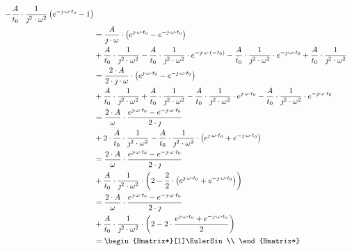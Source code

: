 \begin{task}
\begin{align*}
-\frac{A}{t_{0}}\cdot \frac{1}{\jmath^{2} \cdot \omega^{2}} \left(e^{ -\jmath \cdot \omega \cdot t_{0}}-1\right)\\
&= \frac{A}{\jmath \cdot \omega}\cdot \left( e^{ \jmath \cdot \omega \cdot t_{0}} - e^{ -\jmath \cdot \omega \cdot t_{0}} \right)\\
&+ \frac{A}{t_{0}}\cdot \frac{1}{\jmath^{2} \cdot \omega^{2}}  - \frac{A}{t_{0}}\cdot \frac{1}{\jmath^{2} \cdot \omega^{2}} \cdot e^{ -\jmath \cdot \omega \cdot (-t_{0})} -\frac{A}{t_{0}}\cdot \frac{1}{\jmath^{2} \cdot \omega^{2}} \cdot e^{ -\jmath \cdot \omega \cdot t_{0}} + \frac{A}{t_{0}}\cdot \frac{1}{\jmath^{2} \cdot \omega^{2}}\\
&= \frac{2\cdot A}{2\cdot \jmath \cdot \omega}\cdot \left( e^{ \jmath \cdot \omega \cdot t_{0}} - e^{ -\jmath \cdot \omega \cdot t_{0}} \right)\\
&+ \frac{A}{t_{0}}\cdot \frac{1}{\jmath^{2} \cdot \omega^{2}}  + \frac{A}{t_{0}}\cdot \frac{1}{\jmath^{2} \cdot \omega^{2}}  - \frac{A}{t_{0}}\cdot \frac{1}{\jmath^{2} \cdot \omega^{2}} \cdot e^{\jmath \cdot \omega \cdot t_{0}} -\frac{A}{t_{0}}\cdot \frac{1}{\jmath^{2} \cdot \omega^{2}} \cdot e^{ -\jmath \cdot \omega \cdot t_{0}}\\
&= \frac{2\cdot A}{\omega}\cdot \frac{e^{ \jmath \cdot \omega \cdot t_{0}} - e^{ -\jmath \cdot \omega \cdot t_{0}}}{2\cdot \jmath}\\
&+ 2\cdot \frac{A}{t_{0}}\cdot \frac{1}{\jmath^{2} \cdot \omega^{2}}  - \frac{A}{t_{0}}\cdot \frac{1}{\jmath^{2} \cdot \omega^{2}} \cdot \left(e^{ \jmath \cdot \omega \cdot t_{0}} +e^{ -\jmath \cdot \omega \cdot t_{0}}\right)\\
&= \frac{2\cdot A}{\omega}\cdot \frac{e^{ \jmath \cdot \omega \cdot t_{0}} - e^{ -\jmath \cdot \omega \cdot t_{0}}}{2\cdot \jmath}\\
&+ \frac{A}{t_{0}}\cdot \frac{1}{\jmath^{2} \cdot \omega^{2}} \cdot \left(2  - \frac{2}{2}\cdot \left(e^{ \jmath \cdot \omega \cdot t_{0}} +e^{ -\jmath \cdot \omega \cdot t_{0}}\right)\right)\\
&= \frac{2\cdot A}{\omega}\cdot \frac{e^{ \jmath \cdot \omega \cdot t_{0}} - e^{ -\jmath \cdot \omega \cdot t_{0}}}{2\cdot \jmath}\\
&+ \frac{A}{t_{0}}\cdot \frac{1}{\jmath^{2} \cdot \omega^{2}} \cdot \left(2  - 2\cdot \frac{e^{ \jmath \cdot \omega \cdot t_{0}} +e^{ -\jmath \cdot \omega \cdot t_{0}}}{2}\right)\\
&=\begin{Bmatrix*}[l]%
\EulerSin\\

\end{Bmatrix*}
\end{align*}
\end{task}
